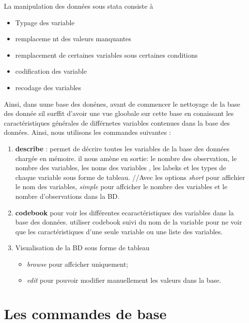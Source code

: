 \documentclass[
]{book}
\providecommand{\tightlist}{%
  \setlength{\itemsep}{0pt}\setlength{\parskip}{0pt}}
\begin{document}
La manipulation des données sous stata consiste à

\begin{itemize}
\tightlist
\item
  Typage des variable
\item
  remplaceme nt des valeurs manquantes
\item
  remplacement de certaines variables sous certaines conditions
\item
  codification des variable
\item
  recodage des variables
\end{itemize}

Ainsi, dans uune base des donénes, avant de commencer le nettoyage de la base des donnée sil surffit d'avoir une vue gloobale sur cette base en conaissant les caractéristiques générales de différnetes variables contenues dans la base des données.
Ainsi, nous utilisons les commandes suivantes :

\begin{enumerate}
\def\labelenumi{(\arabic{enumi})}
\tightlist
\item
  \textbf{describe} : permet de décrire toutes les variables de la base des données chargée en mémoire. il nous amène en sortie: le nombre des observation, le nombre des variables, les noms des variables , les labeks et les types de chaque variable sous forme de tableau. //Avec les options \emph{short} pour affichier le nom des variables, \emph{simple} pour affcicher le nombre des variables et le nombre d'observations dans la BD.
\item
  \textbf{codebook} pour voir les différentes ecaractéristiques des variables dans la base des données. utiliser codebook suivi du nom de la variable pour ne voir que les caractéristiques d'une seule variable ou une liste des variables.
\item
  Visualisation de la BD sous forme de tableau

  \begin{itemize}
  \tightlist
  \item
    \emph{browse} pour affcicher uniquement;
  \item
    \emph{edit} pour pouvoir modifier manuellement les valeurs dans la base.
  \end{itemize}
\end{enumerate}

\hypertarget{les-commandes-de-base}{%
\section{Les commandes de base}\label{les-commandes-de-base}}
\end{document}
